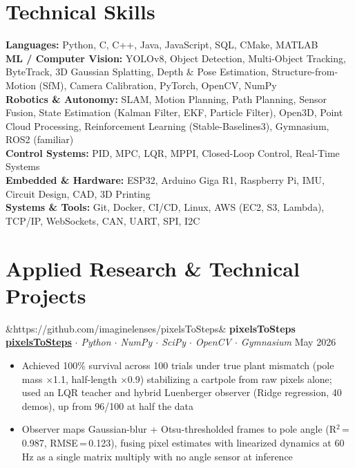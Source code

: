 \documentclass[11pt]{article}
\newcommand{\entryhead}[4][]{%
  \noindent
  \ifx&#1&%
    \textbf{#2}%
  \else
    \href{#1}{\textbf{#2}}%
  \fi
  {\small\textit{ $\cdot$ #3}}%
  \hfill {\small #4}%
}
\begin{document}
\section*{Technical Skills}
{\small
\textbf{Languages:} Python, C, C++, Java, JavaScript, SQL, CMake, MATLAB \\[1pt]
\textbf{ML / Computer Vision:} YOLOv8, Object Detection, Multi-Object Tracking, ByteTrack,
  3D Gaussian Splatting, Depth \& Pose Estimation, Structure-from-Motion (SfM),
  Camera Calibration, PyTorch, OpenCV, NumPy \\[1pt]
\textbf{Robotics \& Autonomy:} SLAM, Motion Planning, Path Planning, Sensor Fusion,
  State Estimation (Kalman Filter, EKF, Particle Filter), Open3D, Point Cloud Processing,
  Reinforcement Learning (Stable-Baselines3), Gymnasium, ROS2 (familiar) \\[1pt]
\textbf{Control Systems:} PID, MPC, LQR, MPPI, Closed-Loop Control, Real-Time Systems \\[1pt]
\textbf{Embedded \& Hardware:} ESP32, Arduino Giga R1, Raspberry Pi, IMU, Circuit Design,
  CAD, 3D Printing \\[1pt]
\textbf{Systems \& Tools:} Git, Docker, CI/CD, Linux,
  AWS (EC2, S3, Lambda), TCP/IP, WebSockets, CAN, UART, SPI, I2C
}

\section*{Applied Research \& Technical Projects}
\entryhead[https://github.com/imaginelenses/pixelsToSteps]
{pixelsToSteps}
{Python $\cdot$ NumPy $\cdot$ SciPy $\cdot$ OpenCV $\cdot$ Gymnasium}
{May 2026}
\begin{itemize}
  \item Achieved 100\% survival across 100 trials under true plant mismatch (pole mass $\times$1.1, half-length $\times$0.9) stabilizing a cartpole from raw pixels alone; used an LQR teacher and hybrid Luenberger observer (Ridge regression, 40 demos), up from 96/100 at half the data
  \item Observer maps Gaussian-blur + Otsu-thresholded frames to pole angle (R$^2$\,=\,0.987, RMSE\,=\,0.123\textdegree{}), fusing pixel estimates with linearized dynamics at 60\,Hz as a single matrix multiply with no angle sensor at inference
\end{itemize}
\end{document}
